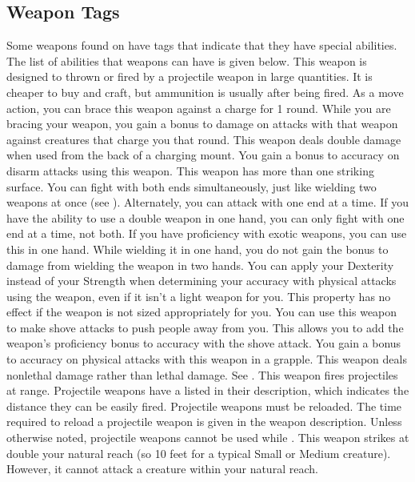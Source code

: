 \subsection{Weapon Tags}
Some weapons found on  have tags that indicate that they have special abilities. The list of abilities that weapons can have is given below.
 This weapon is designed to thrown or fired by a projectile weapon in large quantities. It is cheaper to buy and craft, but ammunition is usually  after being fired.
 As a move action, you can brace this weapon against a charge for 1 round. While you are bracing your weapon, you gain a  bonus to damage on attacks with that weapon against creatures that charge you that round.
 This weapon deals double damage when used from the back of a charging mount.
 You gain a  bonus to accuracy on disarm attacks using this weapon.
 This weapon has more than one striking surface. You can fight with both ends simultaneously, just like wielding two weapons at once (see ). Alternately, you can attack with one end at a time. If you have the ability to use a double weapon in one hand, you can only fight with one end at a time, not both.
 If you have proficiency with exotic weapons, you can use this in one hand. While wielding it in one hand, you do not gain the  bonus to damage from wielding the weapon in two hands.
 You can apply your Dexterity instead of your Strength when determining your accuracy with physical attacks using the weapon, even if it isn't a light weapon for you.
This property has no effect if the weapon is not sized appropriately for you.
 You can use this weapon to make shove attacks to push people away from you. This allows you to add the weapon's proficiency bonus to accuracy with the shove attack.
 You gain a  bonus to accuracy on physical attacks with this weapon in a grapple.
 This weapon deals nonlethal damage rather than lethal damage. See .
 This weapon fires projectiles at range. Projectile weapons have a  listed in their description, which indicates the distance they can be easily fired. Projectile weapons must be reloaded. The time required to reload a projectile weapon is given in the weapon description.
Unless otherwise noted, projectile weapons cannot be used while \prone.
\label{Reach Weapon} This weapon strikes at double your natural reach (so 10 feet for a typical Small or Medium creature). However, it cannot attack a creature within your natural reach.

